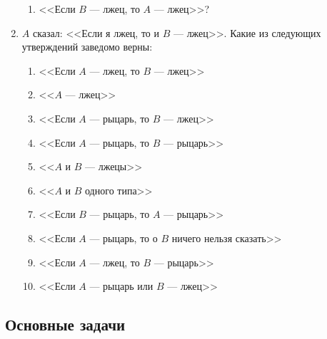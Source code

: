 \begin{enumerate}
\begin{enumerate}
\item <<Если $B$ ---  лжец, то $A$ --- лжец>>?

\end{enumerate}

\item
$A$ сказал: <<Если я лжец, то и $B$ --- лжец>>.
Какие из следующих утверждений заведомо верны:

\begin{enumerate}

\item <<Если $A$ ---  лжец, то $B$ --- лжец>>

\item <<$A$ --- лжец>>

\item <<Если $A$ ---  рыцарь, то $B$ --- лжец>>

\item <<Если $A$ ---  рыцарь, то $B$ --- рыцарь>>

\item <<$A$ и $B$ --- лжецы>>

\item <<$A$ и $B$ одного типа>>

\item <<Если $B$ ---  рыцарь, то $A$ --- рыцарь>>

\item <<Если $A$ ---  рыцарь, то о $B$ ничего нельзя сказать>>

\item <<Если $A$ ---  лжец, то $B$ --- рыцарь>>

\item <<Если $A$ ---  рыцарь или $B$ --- лжец>>

\end{enumerate}

\end{enumerate}


\subsection*{Основные задачи}

